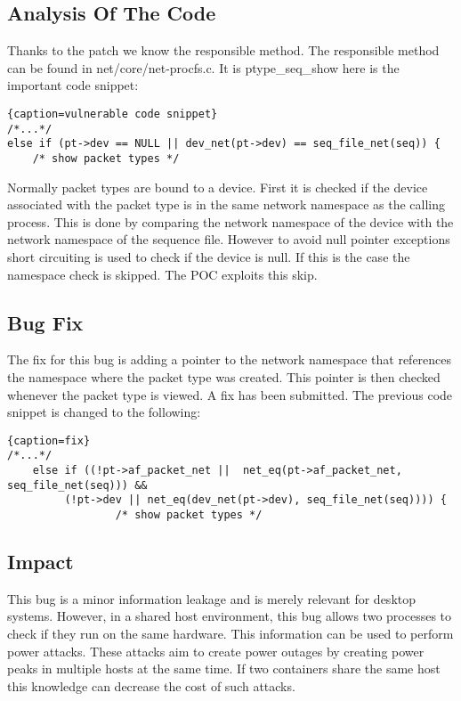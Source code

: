 \documentclass[10pt,twocolumn,a4paper]{article}
\begin{document}
\subsection{Analysis Of The Code}
Thanks to the patch we know the responsible method.
The responsible method can be found in net/core/net-procfs.c. It is ptype\_seq\_show
here is the important code snippet:
\begin{lstlisting}{caption=vulnerable code snippet}
/*...*/
else if (pt->dev == NULL || dev_net(pt->dev) == seq_file_net(seq)) {
    /* show packet types */
\end{lstlisting}
Normally packet types are bound to a device. 
First it is checked if the device associated with the packet type is in the same network namespace as the calling process.
This is done by comparing the network namespace of the device with the network namespace of the sequence file.
However to avoid null pointer exceptions short circuiting is used to check if the device is null. 
If this is the case the namespace check is skipped. The POC exploits this skip.

\subsection{Bug Fix}
The fix for this bug is adding a pointer to the network namespace that references the namespace where the packet type was created.
This pointer is then checked whenever the packet type is viewed.
A fix has been submitted.\cite{4}
The previous code snippet is changed to the following:
\begin{lstlisting}{caption=fix}
/*...*/
	else if ((!pt->af_packet_net ||  net_eq(pt->af_packet_net, seq_file_net(seq))) &&
		 (!pt->dev || net_eq(dev_net(pt->dev), seq_file_net(seq)))) {
                 /* show packet types */
\end{lstlisting}
\cite{4}
\subsection{Impact}
This bug is a minor information leakage and is merely relevant for desktop systems.
However, in a shared host environment, this bug allows two processes to check if they run on the same
hardware.
This information can be used to perform power attacks. 
These attacks aim to create power outages by creating power peaks in multiple hosts at the same time.
If two containers share the same host this knowledge can decrease the cost of such attacks\cite{7}.
\end{document}
